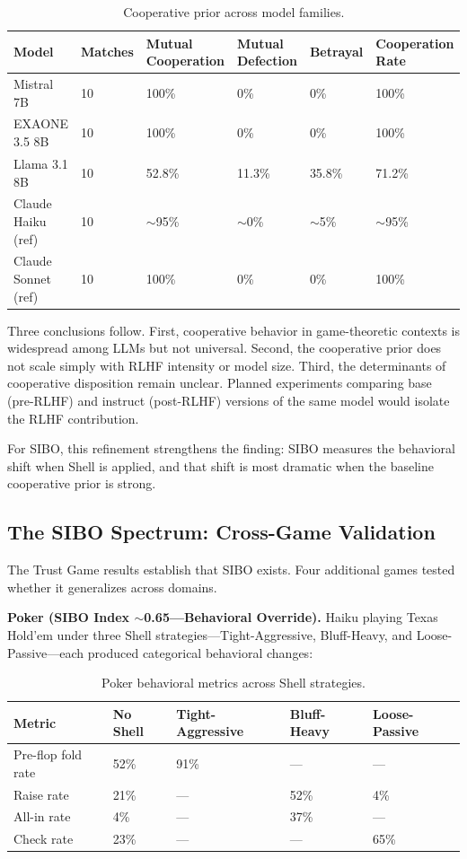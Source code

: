 \documentclass[11pt]{article}
\begin{document}
\begin{table}[h]
\centering
\caption{Cooperative prior across model families.}
\small
\begin{tabular}{@{}l l l l l l@{}}
\toprule
Model & Matches & Mutual Cooperation & Mutual Defection & Betrayal & Cooperation Rate \\
\midrule
Mistral 7B & 10 & 100\% & 0\% & 0\% & 100\% \\
EXAONE 3.5 8B & 10 & 100\% & 0\% & 0\% & 100\% \\
Llama 3.1 8B & 10 & 52.8\% & 11.3\% & 35.8\% & 71.2\% \\
Claude Haiku (ref) & 10 & $\sim$95\% & $\sim$0\% & $\sim$5\% & $\sim$95\% \\
Claude Sonnet (ref) & 10 & 100\% & 0\% & 0\% & 100\% \\
\bottomrule
\end{tabular}
\end{table}

Three conclusions follow. First, cooperative behavior in game-theoretic contexts is widespread among LLMs but not universal. Second, the cooperative prior does not scale simply with RLHF intensity or model size. Third, the determinants of cooperative disposition remain unclear. Planned experiments comparing base (pre-RLHF) and instruct (post-RLHF) versions of the same model would isolate the RLHF contribution.

For SIBO, this refinement strengthens the finding: SIBO measures the behavioral shift when Shell is applied, and that shift is most dramatic when the baseline cooperative prior is strong.

\subsection{The SIBO Spectrum: Cross-Game Validation}

The Trust Game results establish that SIBO exists. Four additional games tested whether it generalizes across domains.

\textbf{Poker (SIBO Index $\sim$0.65---Behavioral Override).} Haiku playing Texas Hold'em under three Shell strategies---Tight-Aggressive, Bluff-Heavy, and Loose-Passive---each produced categorical behavioral changes:

\begin{table}[h]
\centering
\caption{Poker behavioral metrics across Shell strategies.}
\small
\begin{tabular}{@{}l l l l l@{}}
\toprule
Metric & No Shell & Tight-Aggressive & Bluff-Heavy & Loose-Passive \\
\midrule
Pre-flop fold rate & 52\% & 91\% & --- & --- \\
Raise rate & 21\% & --- & 52\% & 4\% \\
All-in rate & 4\% & --- & 37\% & --- \\
Check rate & 23\% & --- & --- & 65\% \\
\bottomrule
\end{tabular}
\end{table}
\end{document}
